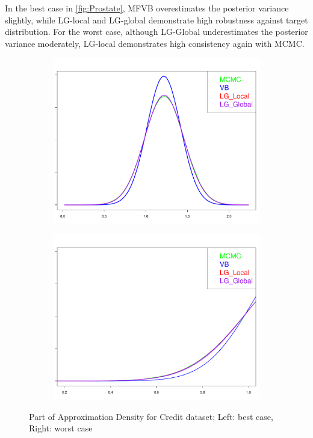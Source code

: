 In the best case in \autoref{fig:Prostate}, MFVB overestimates the posterior variance slightly, while LG-local and LG-global demonstrate high robustness against target distribution. For the worst case, although LG-Global underestimates the posterior variance moderately, LG-local demonstrates high consistency again with MCMC.\\
\begin{figure}[h]
	\begin{subfigure}{0.5\textwidth}
		\centering
		\includegraphics[page = 11, width=\linewidth,keepaspectratio]{lasso_densities_Credit.pdf}
	\end{subfigure}
	\begin{subfigure}{0.5\textwidth}
		\includegraphics[page = 2, width=\linewidth,keepaspectratio]{lasso_densities_Credit-1.pdf}
	\end{subfigure}
	\caption{Part of Approximation Density for Credit dataset; Left: best case, Right: worst case}
	\label{fig:Credit}
\end{figure}
